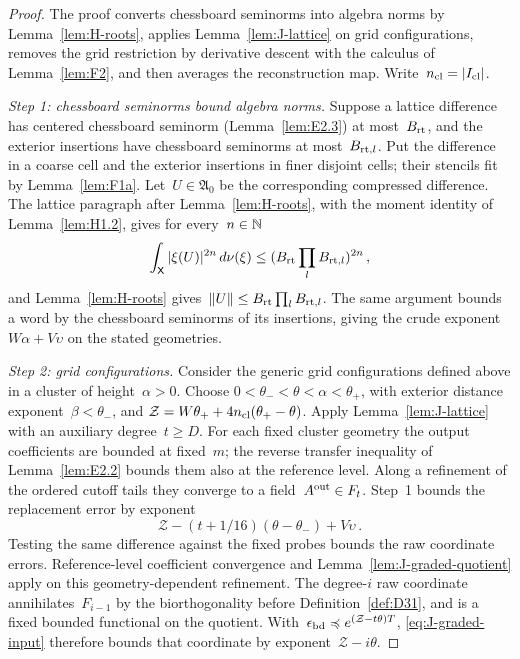 \begin{proof}\label{proof:J-power-start}
The proof converts chessboard seminorms into algebra norms by Lemma~\ref{lem:H-roots}, applies Lemma~\ref{lem:J-lattice} on grid configurations, removes the grid restriction by derivative descent with the calculus of Lemma~\ref{lem:F2}, and then averages the reconstruction map. Write~$n_{\rm cl}=|I_{\rm cl}|$.

\emph{Step 1: chessboard seminorms bound algebra norms.} Suppose a lattice difference has centered chessboard seminorm (Lemma~\ref{lem:E2.3}) at most~$B_{\rm rt}$, and the exterior insertions have chessboard seminorms at most~$B_{{\rm rt},l}$. Put the difference in a coarse cell and the exterior insertions in finer disjoint cells; their stencils fit by Lemma~\ref{lem:F1a}. Let~$U\in\mathfrak A_0$ be the corresponding compressed difference. The lattice paragraph after Lemma~\ref{lem:H-roots}, with the moment identity of Lemma~\ref{lem:H1.2}, gives for every~$n\in\mathbb{N}$
\begin{equation}\label{eq:J-moments}
\int_{\mathsf{X}}|\xi(U)|^{2n}\,d\nu(\xi)
\le(B_{\rm rt}\prod_lB_{{\rm rt},l})^{2n}\,,
\end{equation}
and Lemma~\ref{lem:H-roots} gives~$\|U\|\le B_{\rm rt}\prod_lB_{{\rm rt},l}$. The same argument bounds a word by the chessboard seminorms of its insertions, giving the crude exponent~$W\alpha+V\upsilon$ on the stated geometries.

\emph{Step 2: grid configurations.} Consider the generic grid configurations defined above in a cluster of height~$\alpha>0$. Choose $0<\theta_-<\theta<\alpha<\theta_+$, with exterior distance exponent~$\beta<\theta_-$, and $\mathcal Z=W\theta_++4n_{\rm cl}(\theta_+-\theta)$. Apply Lemma~\ref{lem:J-lattice} with an auxiliary degree~$t\ge D$. For each fixed cluster geometry the output coefficients are bounded at fixed~$m$; the reverse transfer inequality of Lemma~\ref{lem:E2.2} bounds them also at the reference level. Along a refinement of the ordered cutoff tails they converge to a field~$A^{\rm out}\in F_t$. Step~1 bounds the replacement error by exponent
\begin{equation*}
\mathcal Z-(t+1/16)(\theta-\theta_-)+V\upsilon\,.
\end{equation*}
Testing the same difference against the fixed probes bounds the raw coordinate errors. Reference-level coefficient convergence and Lemma~\ref{lem:J-graded-quotient} apply on this geometry-dependent refinement. The degree-$i$ raw coordinate annihilates~$F_{i-1}$ by the biorthogonality before Definition~\ref{def:D31}, and is a fixed bounded functional on the quotient. With~$\epsilon_{\rm bd}\preccurlyeq e^{(\mathcal Z-t\theta)T}$, \eqref{eq:J-graded-input} therefore bounds that coordinate by exponent~$\mathcal Z-i\theta$.


\end{proof}
